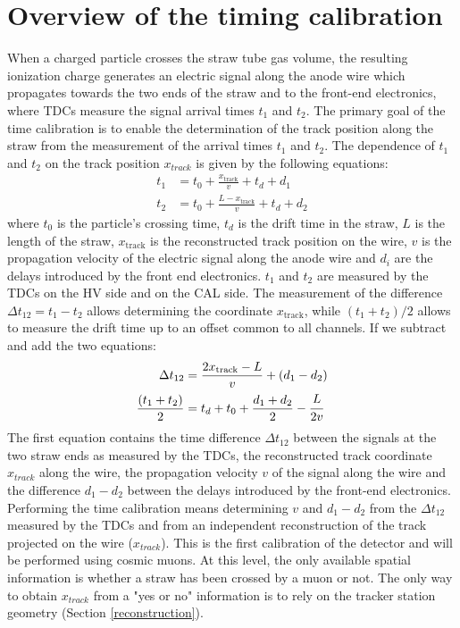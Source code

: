 \section{Overview of the timing calibration}
When a charged particle crosses the straw tube 
gas volume, the resulting ionization charge 
generates an electric signal along the anode  
wire which propagates towards the two ends of 
the straw and to the front-end electronics, 
where TDCs measure the signal arrival 
times $t_1$ and $t_2$. The primary goal of 
the time calibration is to enable the 
determination of the track position 
along the straw from the measurement of 
the arrival times $t_1$ and $t_2$. 
The dependence of $t_1$ and $t_2$ on the track 
position $x_{track}$ is given by the following equations:
\begin{equation}
\begin{aligned}
    t_1 &= t_0 + \frac{x_{\text{track}}}{v} + t_d + d_1 \\
    t_2 &= t_0 + \frac{L - x_{\text{track}}}{v} + t_d + d_2
\end{aligned}
\end{equation}
where $t_0$ is the particle's crossing time, 
$t_d$ is the drift time in the straw, 
$L$ is the length of the straw, 
$x_{\text{track}}$ is the 
reconstructed track position on the wire, $v$ 
is the propagation velocity of 
the electric signal along the anode 
wire and $d_i$ are the delays  
introduced by the front end electronics. 
$t_1$ and $t_2$ are measured  
by the TDCs on the HV side and on the CAL side.
The measurement of the difference 
$\Delta t_{12}=t_1-t_2$ allows 
determining the coordinate $x_{\text{track}}$, 
while $(t_1 + t_2) / 2$ allows to measure the drift time  
up to an offset common to all channels. 
If we subtract and add the two equations:
\begin{equation}\label{ffffff}
    \begin{aligned}
        \Delta t_{12} &= \frac{2x_{\text{track}}-L}{v} +(d_1-d_2)  \\
        \frac{(t_1 + t_2)}{2} &= t_d+t_0+\frac{d_1+d_2}{2}-\cfrac{L}{2v} 
    \end{aligned}
    \end{equation}
The first equation contains the time 
difference $\Delta t_{12}$ between the 
signals at the two straw ends as measured 
by the TDCs, the reconstructed track coordinate 
$x_{track}$ along the wire, the propagation  
velocity $v$ of the signal along the wire and 
the difference $d_1-d_2$ between the delays introduced by 
the front-end electronics. 
Performing the time calibration means 
determining $v$ and $d_1-d_2$ from the $\Delta t_{12}$ 
measured by the TDCs and from an independent 
reconstruction of the track 
projected on the wire ($x_{track}$).
This is the first calibration of the detector and 
will be performed using cosmic muons. 
At this level, the only available spatial 
information is whether a straw has been crossed 
by a muon or not. The 
only way to obtain $x_{track}$ from a "yes or no" 
information is to rely on the tracker station 
geometry (Section \ref{reconstruction}).

